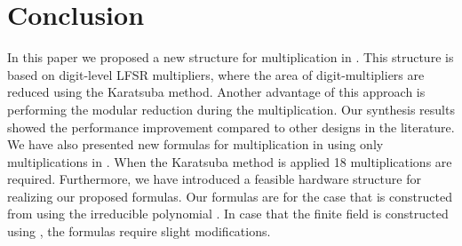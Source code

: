 \documentclass{article}
\begin{document}
\section{Conclusion}
\label{sec:conclusion}

In this paper we proposed a new structure for multiplication in
. This structure is based on digit-level LFSR multipliers, 
where the area of digit-multipliers are reduced using the Karatsuba
method. 
Another advantage of this approach is performing the modular reduction
during the multiplication. Our synthesis results showed the
performance improvement compared to other designs in the
literature. We have also presented new formulas for multiplication in
 using only  multiplications in
.
When the Karatsuba method is applied 18 multiplications are required.
Furthermore, we have introduced a feasible hardware structure for realizing our proposed formulas. Our formulas are for the case that  is
constructed from  using the irreducible
polynomial . In case that the finite field is constructed using
, the formulas require slight modifications.

\small
\end{document}
